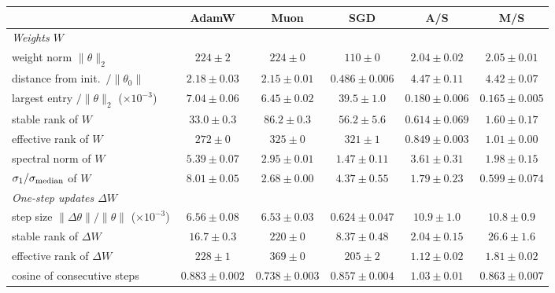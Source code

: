 \begin{center}\small\begin{minipage}{\linewidth}\centering
\captionsetup{type=table}
\caption{The metrics of \cref{tab:app-am} with SGD as a reference: ratios AdamW/SGD and Muon/SGD. Bold: in each
ratio column, the five ratios farthest from 1 whose range excludes 1.}
\label{tab:app-sgd}
\footnotesize\setlength{\tabcolsep}{2.5pt}\setlength{\aboverulesep}{0pt}\setlength{\belowrulesep}{0pt}%
\renewcommand{\arraystretch}{1.15}%
\begin{tabular}{@{}l|ccc|cc@{}}
 & AdamW & Muon & SGD & A/S & M/S \\
\midrule
\emph{Weights $W$} & & & & & \\
weight norm $\|\theta\|_2$ & $224 \pm 2$ & $224 \pm 0$ & $110 \pm 0$ & $2.04 \pm 0.02$ & $2.05 \pm 0.01$ \\
distance from init.\ $/\|\theta_0\|$ & $2.18 \pm 0.03$ & $2.15 \pm 0.01$ & $0.486 \pm 0.006$ & $4.47 \pm 0.11$ & $4.42 \pm 0.07$ \\
largest entry $/\|\theta\|_2$ ($\times10^{-3}$) & $7.04 \pm 0.06$ & $6.45 \pm 0.02$ & $39.5 \pm 1.0$ & $0.180 \pm 0.006$ & {\boldmath\textbf{$0.165 \pm 0.005$}} \\
stable rank of $W$ & $33.0 \pm 0.3$ & $86.2 \pm 0.3$ & $56.2 \pm 5.6$ & $0.614 \pm 0.069$ & $1.60 \pm 0.17$ \\
effective rank of $W$ & $272 \pm 0$ & $325 \pm 0$ & $321 \pm 1$ & $0.849 \pm 0.003$ & $1.01 \pm 0.00$ \\
spectral norm of $W$ & $5.39 \pm 0.07$ & $2.95 \pm 0.01$ & $1.47 \pm 0.11$ & $3.61 \pm 0.31$ & $1.98 \pm 0.15$ \\
$\sigma_1/\sigma_{\rm median}$ of $W$ & $8.01 \pm 0.05$ & $2.68 \pm 0.00$ & $4.37 \pm 0.55$ & $1.79 \pm 0.23$ & $0.599 \pm 0.074$ \\
\emph{One-step updates $\Delta W$} & & & & & \\
step size $\|\Delta\theta\|/\|\theta\|$ ($\times10^{-3}$) & $6.56 \pm 0.08$ & $6.53 \pm 0.03$ & $0.624 \pm 0.047$ & {\boldmath\textbf{$10.9 \pm 1.0$}} & {\boldmath\textbf{$10.8 \pm 0.9$}} \\
stable rank of $\Delta W$ & $16.7 \pm 0.3$ & $220 \pm 0$ & $8.37 \pm 0.48$ & $2.04 \pm 0.15$ & {\boldmath\textbf{$26.6 \pm 1.6$}} \\
effective rank of $\Delta W$ & $228 \pm 1$ & $369 \pm 0$ & $205 \pm 2$ & $1.12 \pm 0.02$ & $1.81 \pm 0.02$ \\
cosine of consecutive steps & $0.883 \pm 0.002$ & $0.738 \pm 0.003$ & $0.857 \pm 0.004$ & $1.03 \pm 0.01$ & $0.863 \pm 0.007$ \\

\end{tabular}
\end{minipage}
\end{center}
